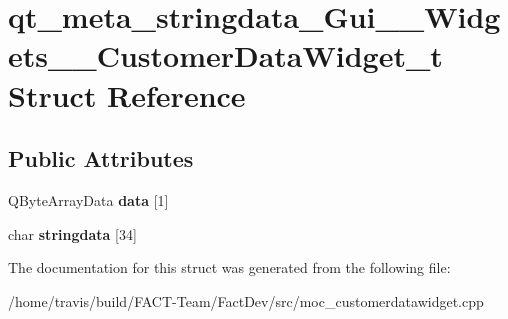 \hypertarget{structqt__meta__stringdata__Gui____Widgets____CustomerDataWidget__t}{\section{qt\-\_\-meta\-\_\-stringdata\-\_\-\-Gui\-\_\-\-\_\-\-Widgets\-\_\-\-\_\-\-Customer\-Data\-Widget\-\_\-t Struct Reference}
\label{structqt__meta__stringdata__Gui____Widgets____CustomerDataWidget__t}
}
\subsection*{Public Attributes}
\begin{DoxyCompactItemize}
\item 
\hypertarget{structqt__meta__stringdata__Gui____Widgets____CustomerDataWidget__t_a738e4b725ed145be74b1ed55ac92cbf7}{Q\-Byte\-Array\-Data {\bfseries data} \mbox{[}1\mbox{]}}\label{structqt__meta__stringdata__Gui____Widgets____CustomerDataWidget__t_a738e4b725ed145be74b1ed55ac92cbf7}

\item 
\hypertarget{structqt__meta__stringdata__Gui____Widgets____CustomerDataWidget__t_adef183befd3d5874441ba80d583b5a9e}{char {\bfseries stringdata} \mbox{[}34\mbox{]}}\label{structqt__meta__stringdata__Gui____Widgets____CustomerDataWidget__t_adef183befd3d5874441ba80d583b5a9e}

\end{DoxyCompactItemize}


The documentation for this struct was generated from the following file\-:\begin{DoxyCompactItemize}
\item 
/home/travis/build/\-F\-A\-C\-T-\/\-Team/\-Fact\-Dev/src/moc\-\_\-customerdatawidget.\-cpp\end{DoxyCompactItemize}
